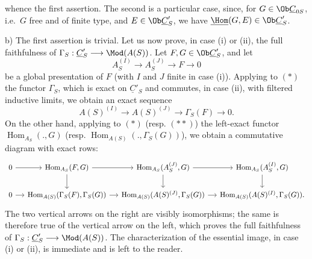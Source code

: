 %
whence the
first assertion. The second is a particular case, since, for $G\in\Ob\underline{C}_{0S}$, i.e.\ $G$ free and of finite type, and $E\in\Ob\underline{C}'_S$, we have $\underline{\Hom}(G,E)\in\Ob\underline{C}'_S$.

b) The first assertion is trivial. Let us now prove, in case (i) or (ii), the full faithfulness of $\Gamma_S:\underline{C}'_S\longrightarrow\Mod(A(S))$. Let $F,G\in\Ob\underline{C}'_S$, and let
\[
A_S^{(I)}\longrightarrow A_S^{(J)}\longrightarrow F\longrightarrow0
\tag{$*$}
\]
be a global presentation of $F$ (with $I$ and $J$ finite in case (i)). Applying to $(*)$ the functor $\Gamma_S$, which is exact on $\underline{C}'_S$ and commutes, in case (ii), with filtered inductive limits, we obtain an exact sequence
\[
A(S)^{(I)}\longrightarrow A(S)^{(J)}\longrightarrow\Gamma_S(F)\longrightarrow0.
\tag{$**$}
\]
On the other hand, applying to $(*)$ (resp. $(**)$) the left-exact functor $\operatorname{Hom}_{A_S}(.,G)$ (resp. $\operatorname{Hom}_{A(S)}(.,\Gamma_S(G))$), we obtain a commutative diagram with exact rows:
\[
\begin{tikzcd}[column sep=small]
0 \arrow[r] & \operatorname{Hom}_{A_S}(F,G) \arrow[r] \arrow[d] &
\operatorname{Hom}_{A_S}(A_S^{(J)},G) \arrow[r] \arrow[d] &
\operatorname{Hom}_{A_S}(A_S^{(I)},G) \arrow[d] \\
0 \arrow[r] & \operatorname{Hom}_{A(S)}(\Gamma_S(F),\Gamma_S(G)) \arrow[r] &
\operatorname{Hom}_{A(S)}(A(S)^{(J)},\Gamma_S(G)) \arrow[r] &
\operatorname{Hom}_{A(S)}(A(S)^{(I)},\Gamma_S(G)).
\end{tikzcd}
\]
The two vertical arrows on the right are visibly isomorphisms; the same is therefore true of the vertical arrow on the left, which proves the full faithfulness of $\Gamma_S:\underline{C}'_S\longrightarrow\Mod(A(S))$. The characterization of the essential image, in case (i) or (ii), is immediate and is left to the reader.

